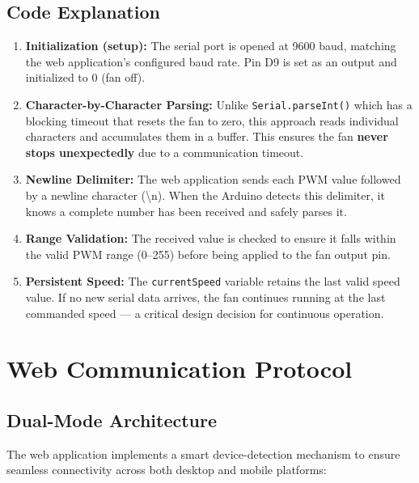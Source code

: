 \documentclass[12pt,a4paper]{article}
\begin{document}
\subsection{Code Explanation}

\begin{enumerate}
    \item \textbf{Initialization (setup):} The serial port is opened at 9600 baud, matching the web application's configured baud rate. Pin D9 is set as an output and initialized to 0 (fan off).
    
    \item \textbf{Character-by-Character Parsing:} Unlike \texttt{Serial.parseInt()} which has a blocking timeout that resets the fan to zero, this approach reads individual characters and accumulates them in a buffer. This ensures the fan \textbf{never stops unexpectedly} due to a communication timeout.
    
    \item \textbf{Newline Delimiter:} The web application sends each PWM value followed by a newline character (\textbackslash n). When the Arduino detects this delimiter, it knows a complete number has been received and safely parses it.
    
    \item \textbf{Range Validation:} The received value is checked to ensure it falls within the valid PWM range (0--255) before being applied to the fan output pin.
    
    \item \textbf{Persistent Speed:} The \texttt{currentSpeed} variable retains the last valid speed value. If no new serial data arrives, the fan continues running at the last commanded speed --- a critical design decision for continuous operation.
\end{enumerate}

\newpage

\section{Web Communication Protocol}

\subsection{Dual-Mode Architecture}
The web application implements a smart device-detection mechanism to ensure seamless connectivity across both desktop and mobile platforms:
\end{document}
